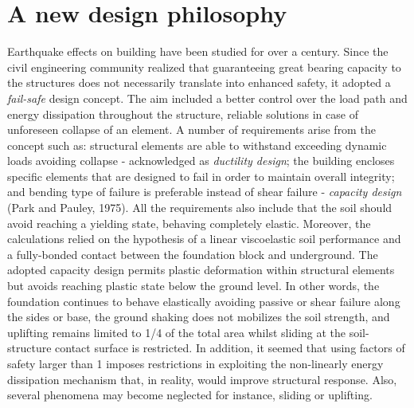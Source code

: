 \documentclass[10pt,a4paper]{report}
\begin{document}
\section{A new design philosophy}
Earthquake effects on building have been studied for over a century. Since the civil engineering community realized that guaranteeing great bearing capacity to the structures does not necessarily translate into enhanced safety, it adopted a \textit{fail-safe} design concept. The aim included a better control over the load path and energy dissipation throughout the structure, reliable solutions in case of unforeseen collapse of an element. A number of requirements arise from the concept such as: structural elements are able to withstand exceeding dynamic loads avoiding collapse - acknowledged as \textit{ductility design}; the building encloses specific elements that are designed to fail in order to maintain overall integrity; and bending type of failure is preferable instead of shear failure - \textit{capacity design }(Park and Pauley, 1975). 
All the requirements also include that the soil should avoid reaching a yielding state, behaving completely elastic. Moreover, the calculations relied on the hypothesis of a linear viscoelastic soil performance and a fully-bonded contact between the foundation block and underground. The adopted capacity design permits plastic deformation within structural elements but avoids reaching plastic state below the ground level. In other words, the foundation continues to behave elastically avoiding passive or shear failure along the sides or base, the ground shaking does not mobilizes the soil strength, and uplifting remains limited to 1/4 of the total area whilst sliding at the soil-structure contact surface is restricted.  In addition, it seemed that using factors of safety larger than 1 imposes restrictions in exploiting the non-linearly energy dissipation mechanism that, in reality, would improve structural response. Also, several phenomena may become neglected for instance, sliding or uplifting.
\end{document}
